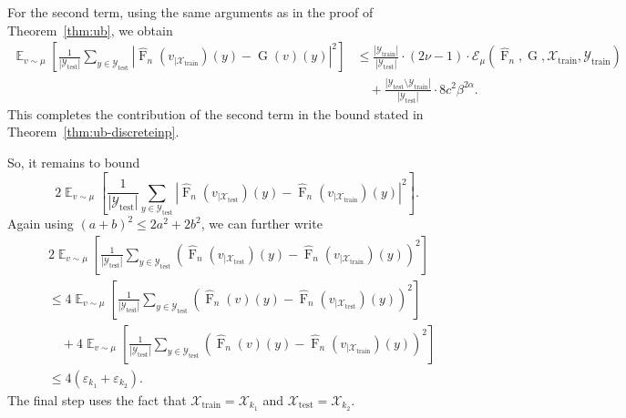 \documentclass[11pt]{article}
\theoremstyle{plain}
\newcommand{\Xcal}{\mathcal{X}}
\newcommand{\Ycal}{\mathcal{Y}}
\newcommand{\Ecal}{\mathcal{E}}
\DeclareMathOperator*{\expect}{\mathbb{E}}
\begin{document}
For the second term, using the same arguments as in the proof of Theorem~\ref{thm:ub}, we obtain
\begin{equation*}
\begin{split}
\expect_{v \sim \mu} \left[ \frac{1}{|\Ycal_{\mathrm{test}}|} \sum_{y \in \Ycal_{\mathrm{test}}} \left|\widehat{\operatorname{F}}_n(v_{|\Xcal_{\mathrm{train}}})(y) - \operatorname{G}(v)(y)\right|^2 \right]
&\leq \frac{|\Ycal_{\mathrm{train}}|}{|\Ycal_{\mathrm{test}}|} \cdot (2\nu - 1) \cdot \Ecal_{\mu}(\widehat{\operatorname{F}}_n, \operatorname{G}, \Xcal_{\mathrm{train}}, \Ycal_{\mathrm{train}}) \\
&\quad + \frac{|\Ycal_{\mathrm{test}} \setminus \Ycal_{\mathrm{train}}|}{|\Ycal_{\mathrm{test}}|} \cdot 8c^2 \beta^{2\alpha}.
\end{split}
\end{equation*}
This completes the contribution of the second term in the bound stated in Theorem~\ref{thm:ub-discreteinp}.


So, it remains to bound
\[2\expect_{v \sim \mu} \left[ \frac{1}{|\Ycal_{\mathrm{test}}|} \sum_{y \in \Ycal_{\mathrm{test}}} |\widehat{\operatorname{F}}_n(v_{|\Xcal_{\mathrm{test}}})(y) - \widehat{\operatorname{F}}_n(v_{|\Xcal_{\mathrm{train}}})(y)| ^2 \right].\]
Again using $ (a+b)^2 \leq 2a^2 + 2b^2 $, we can further write
\begin{equation*}
\begin{split}
&2\expect_{v \sim \mu} \left[ \frac{1}{|\Ycal_{\mathrm{test}}|} \sum_{y \in \Ycal_{\mathrm{test}}} \left( \widehat{\operatorname{F}}_n(v_{|\Xcal_{\mathrm{test}}})(y) - \widehat{\operatorname{F}}_n(v_{|\Xcal_{\mathrm{train}}})(y) \right)^2 \right] \\
&\leq 4 \expect_{v \sim \mu} \left[ \frac{1}{|\Ycal_{\mathrm{test}}|} \sum_{y \in \Ycal_{\mathrm{test}}} \left( \widehat{\operatorname{F}}_n(v)(y) - \widehat{\operatorname{F}}_n(v_{|\Xcal_{\mathrm{test}}})(y) \right)^2 \right] \\
&\quad + 4 \expect_{v \sim \mu} \left[ \frac{1}{|\Ycal_{\mathrm{test}}|} \sum_{y \in \Ycal_{\mathrm{test}}} \left( \widehat{\operatorname{F}}_n(v)(y) - \widehat{\operatorname{F}}_n(v_{|\Xcal_{\mathrm{train}}})(y) \right)^2 \right]\\
&\leq 4(\varepsilon_{k_1} +\varepsilon_{k_2}).
\end{split}
\end{equation*}
The final step uses the fact that $\Xcal_{\mathrm{train}}=\Xcal_{k_1}$ and $\Xcal_{\mathrm{test}}=\Xcal_{k_2}$.
\end{document}
